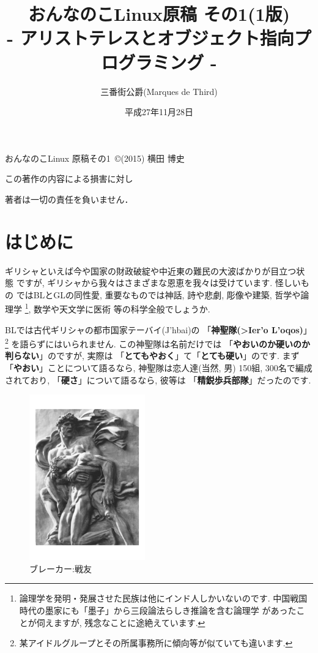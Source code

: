 \documentclass[b5j,8pt,twocolumn]{ltjsarticle}
\title{おんなのこLinux原稿 その1(1版)\\
- アリストテレスとオブジェクト指向プログラミング -}
\author{三番街公爵(Marques de Third)}
\date{
平成27年11月28日
 }
\newcommand{\textgreek}[1]{\begingroup\fontencoding{LGR}\selectfont#1\endgroup}
\begin{document}
\maketitle



おんなのこLinux 原稿その1~\copyright (2015) 横田 博史\par

この著作の内容による損害に対し

著者は一切の責任を負いません．
\clearpage
\newpage
\setcounter{page}{1}

\section{はじめに}

ギリシャといえば今や国家の財政破綻や中近東の難民の大波ばかりが目立つ状態
ですが, ギリシャから我々はさまざまな恩恵を我々は受けています. 怪しいもの
ではBLとGLの同性愛, 重要なものでは神話, 詩や悲劇, 彫像や建築, 哲学や論理学
\footnote{論理学を発明・発展させた民族は他にインド人しかいないのです.
 中国戦国時代の墨家にも「墨子」\cite{墨子}から三段論法らしき推論を含む論理学
があったことが伺えますが, 残念なことに途絶えています.}, 数学や天文学に医術
等の科学全般でしょうか.
\newline

BLでは古代ギリシャの都市国家テーバイ(\textgreek{J'hbai})の
「\textbf{神聖隊(\textgreek{>Ier'o L'oqos})}」
\footnote{某アイドルグループとその所属事務所に傾向等が似ていても違います.}
を語らずにはいられません. この神聖隊は名前だけでは
「\textbf{やおいのか硬いのか判らない}」のですが, 実際は
「\textbf{とてもやおく}」て「\textbf{とても硬い}」のです. まず
「\textbf{やおい}」ことについて語るなら, 神聖隊は恋人達(当然, 男)
150組, 300名で編成されており, 「\textbf{硬さ}」について語るなら, 彼等は
「\textbf{精鋭歩兵部隊}」だったのです.
\newline
 
 
\begin{figure}
\includegraphics[width=5cm]{arno_breker_kameradschaft.pdf}
\caption{ブレーカー:戦友}
\label{fig:breker2}
\end{figure}
\end{document}
